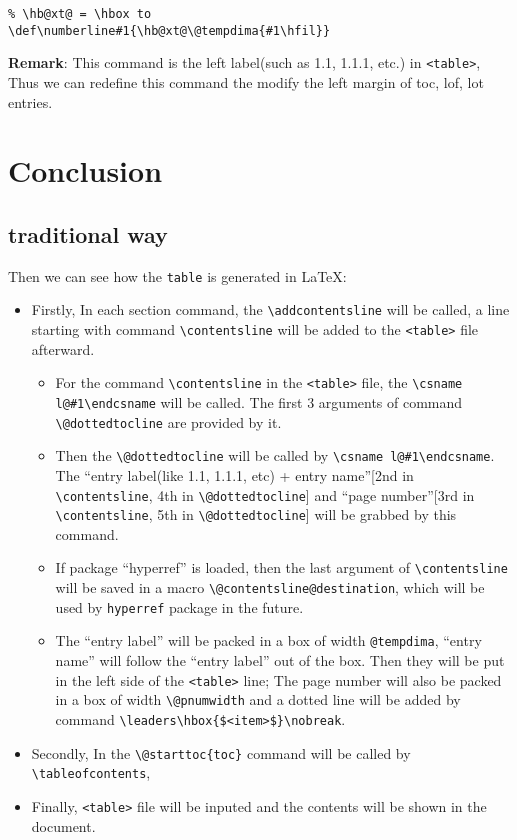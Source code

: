 \documentclass{article}
\begin{document}
\begin{lstlisting}
% \hb@xt@ = \hbox to 
\def\numberline#1{\hb@xt@\@tempdima{#1\hfil}}
\end{lstlisting}

\textbf{Remark}: This command is the left label(such as 1.1, 1.1.1, etc.) in \verb|<table>|, Thus we can redefine this 
command the modify the left margin of toc, lof, lot entries.



\section{Conclusion}
\subsection{traditional way}
Then we can see how the \verb|table| is generated in \LaTeX{}:

\begin{itemize}
  \item Firstly, In each section command, the \verb|\addcontentsline| will be called, a line starting with command \verb|\contentsline| 
    will be added to the \verb|<table>| file afterward.
    \begin{itemize}
      \item For the command \verb|\contentsline| in the \verb|<table>| file, the \verb|\csname l@#1\endcsname| will be called. The first 3 arguments 
        of command \verb|\@dottedtocline| are provided by it.
      \item Then the \verb|\@dottedtocline| will be called by \verb|\csname l@#1\endcsname|. The ``entry label(like 1.1, 1.1.1, etc) +
        entry name''[{\color{gray}2nd in \verb|\contentsline|, 4th in \verb|\@dottedtocline|}] and ``page number''[{\color{gray}3rd in \verb|\contentsline|, 5th in \verb|\@dottedtocline|}]
        will be grabbed by this command. 
      \item If package ``hyperref'' is loaded, then the last argument of \verb|\contentsline| will be saved in a macro \verb|\@contentsline@destination|, 
        which will be used by \verb|hyperref| package in the future.
      \item The ``entry label'' will be packed in a box of width \verb|@tempdima|, ``entry name'' will follow the ``entry label'' out of the box. 
        Then they will be put in the left side of the \verb|<table>| line; The page number will also be packed in a box of width \verb|\@pnumwidth| and a dotted line will be 
        added by command \verb|\leaders\hbox{$<item>$}\nobreak|.
    \end{itemize}
  \item Secondly, In the \verb|\@starttoc{toc}| command will be called by \verb|\tableofcontents|, 
  \item Finally, \verb|<table>| file will be inputed and the contents will be shown in the document.
\end{itemize}
\end{document}
